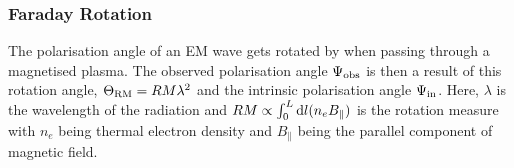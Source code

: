 \documentclass[12pt, a4 paper]{article}
\newcommand{\Andrew}[1]{\textcolor{dg}{#1}}
\begin{document}

\iffalse

\subsubsection{Faraday Rotation}\label{Faraday_Rotation}
The polarisation angle of an EM wave gets rotated by when passing through a magnetised plasma. The observed polarisation angle $\Psi_{\rm obs }$ is then a result of this rotation angle, $\Theta_{\rm RM} = RM\lambda^2$ and the intrinsic polarisation angle $\Psi_{\rm in}$. Here, $\lambda$ is the wavelength of the radiation and $RM \propto \int_0^L {\rm d}l(n_e B_{\parallel})$ is the rotation measure with $n_e$ being thermal electron density and $B_{\parallel}$ being the parallel component of magnetic field.
\end{document}
